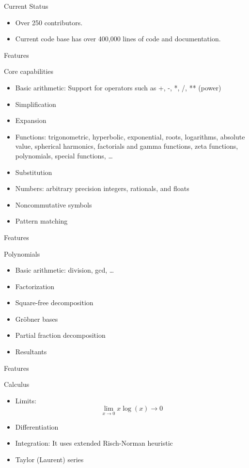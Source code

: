 \documentclass[xcolor=svgnames]{beamer}
\begin{document}
\begin{frame}
  \begin{block}{Current Status}
    \begin{itemize}
    \item Over 250 contributors.
    \item Current code base has over 400,000 lines of code and documentation.
    \end{itemize}
  \end{block}
\end{frame}

\begin{frame}{Features}
\begin{block}{Core capabilities}
\begin{itemize}
\item Basic arithmetic: Support for operators such as +, -, *, /, ** (power)
\item Simplification
\item Expansion
\item Functions: trigonometric, hyperbolic, exponential, roots, logarithms,
  absolute value, spherical harmonics, factorials and gamma functions, zeta
  functions, polynomials, special functions, \ldots
\item Substitution
\item Numbers: arbitrary precision integers, rationals, and floats
\item Noncommutative symbols
\item Pattern matching
\end{itemize}
\end{block}
\end{frame}

\begin{frame}{Features}
\begin{block}{Polynomials}
\begin{itemize}
\item Basic arithmetic: division, gcd, \ldots
\item Factorization
\item Square-free decomposition
\item Gröbner bases
\item Partial fraction decomposition
\item Resultants
\end{itemize}
\end{block}
\end{frame}

\begin{frame}{Features}
\begin{block}{Calculus}
\begin{itemize}
\item Limits: $$\lim_{x\to 0}{x\log(x)} \rightarrow 0$$
\item Differentiation
\item Integration: It uses extended Risch-Norman heuristic
\item Taylor (Laurent) series
\end{itemize}
\end{block}
\end{frame}
\end{document}
